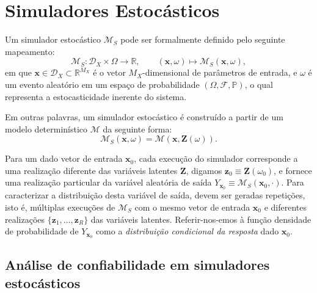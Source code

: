 \section{Simuladores Estocásticos}

Um simulador estocástico \( \mathcal{M}_S \) pode ser formalmente definido pelo seguinte mapeamento:
\begin{equation}
\mathcal{M}_S : \mathcal{D}_X \times \Omega \rightarrow \mathbb{R}, \qquad
(\mathbf{x}, \omega) \mapsto \mathcal{M}_S(\mathbf{x}, \omega),
\end{equation}
em que \( \mathbf{x} \in \mathcal{D}_X \subset \mathbb{R}^{M_X} \) é o vetor \( M_X \)-dimensional de parâmetros de entrada, e \( \omega \) é um evento aleatório em um espaço de probabilidade \( (\Omega, \mathcal{F}, \mathbb{P}) \), o qual representa a estocasticidade inerente do sistema.  


Em outras palavras, um simulador estocástico é construído a partir de um modelo determinístico \( \mathcal{M} \) da seguinte forma:
\begin{equation}
\mathcal{M}_S(\mathbf{x}, \omega) = \mathcal{M}(\mathbf{x}, \mathbf{Z}(\omega)).
\label{eq3}
\end{equation}

Para um dado vetor de entrada \( \mathbf{x}_0 \), cada execução do simulador corresponde a uma realização diferente das variáveis latentes \( \mathbf{Z} \), digamos \( \mathbf{z}_0 \equiv \mathbf{Z}(\omega_0) \), e fornece uma realização particular da variável aleatória de saída \( Y_{\mathbf{x}_0} \equiv \mathcal{M}_S(\mathbf{x}_0, \cdot) \).  
Para caracterizar a distribuição desta variável de saída, devem ser geradas repetições, isto é, múltiplas execuções de \( \mathcal{M}_S \) com o mesmo vetor de entrada \( \mathbf{x}_0 \) e diferentes realizações \(\{\mathbf{z}_1, \ldots, \mathbf{z}_R\}\) das variáveis latentes.  Referir-nos-emos à função densidade de probabilidade de \( Y_{\mathbf{x}_0} \) como a \textit{distribuição condicional da resposta} dado \( \mathbf{x}_0 \).

 
\subsection{Análise de confiabilidade em simuladores estocásticos}

